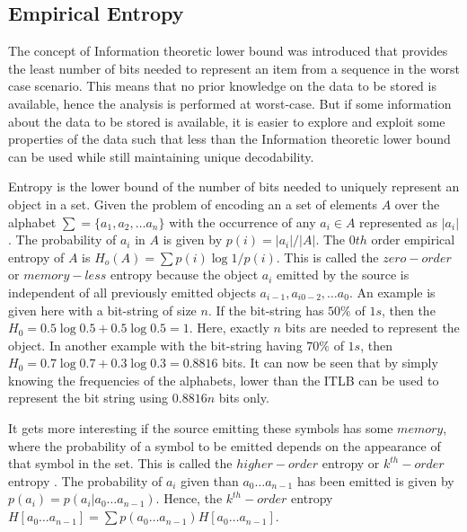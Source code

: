 \subsection{Empirical Entropy}
\label{entropy}
The concept of Information theoretic lower bound was introduced that provides the least number of bits needed to represent an item from a sequence in the worst case scenario. This means that no prior knowledge on the data to be stored is available, hence the analysis is performed at worst-case. But if some information about the data to be stored is available, it is easier to explore and exploit some properties of the data such that less than the Information theoretic lower bound can be used while still maintaining unique decodability.\par
Entropy is the lower bound of the number of bits needed to uniquely represent an object in a set. Given the problem of encoding an a set of elements $A$ over the alphabet $\sum = \{a_1, a_2, \ldots a_n\}$ with the occurrence of any $a_i \in A$ represented as $|a_i|$. The probability of $a_i$ in $A$ is given by $p(i) = |a_i| / |A|$. The $0th$ order empirical entropy of $A$ is $H_o(A) = \sum p(i) \log 1/p(i)$. This is called the $zero-order$ or $memory-less$ entropy because the object $a_i$ emitted by the source is independent of all previously emitted objects $a_{i-1}, a_{i0-2}, \ldots a_0$. An example is given here with a bit-string of size $n$. If the bit-string has $50\%$ of $1s$, then the $H_0 = 0.5\log 0.5 + 0.5\log 0.5 = 1$. Here, exactly $n$ bits are needed to represent the object. In another example with the bit-string having $70\%$ of $1s$, then $H_0 = 0.7\log 0.7 + 0.3\log0.3 = 0.8816$ bits. It can now be seen that by simply knowing the frequencies of the alphabets, lower than the ITLB can be used to represent the bit string using $0.8816n$ bits only.\par
It gets more interesting if the source emitting these symbols has some $memory$, where the probability of a symbol to be emitted depends on the appearance of that symbol in the set. This is called the $higher-order$ entropy or $k^{th}-order$ entropy  \cite{Navarro_2016}. The probability of $a_i$ given than $a_0 \ldots a_{n-1}$ has been emitted is given by $p(a_i) = p(a_i|a_0 \ldots a_{n-1})$. Hence, the $k^{th}-order$ entropy $H[a_0 \ldots a_{n-1}] = \sum p(a_0 \ldots a_{n-1}) H[a_0 \ldots a_{n-1}]$.

